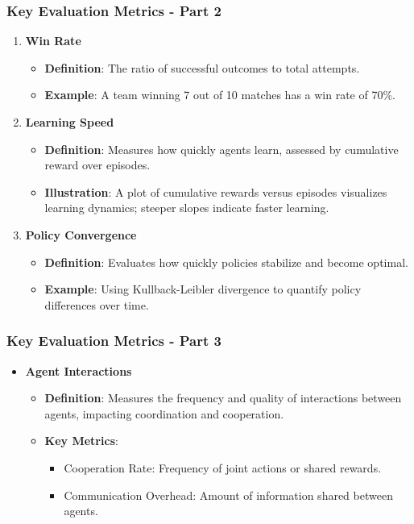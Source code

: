 \documentclass[aspectratio=169]{beamer}
\begin{document}
\begin{frame}[fragile]
    \frametitle{Key Evaluation Metrics - Part 2}
    \begin{enumerate}[resume]
        \item \textbf{Win Rate}
        \begin{itemize}
            \item \textbf{Definition}: The ratio of successful outcomes to total attempts.
            \item \textbf{Example}: A team winning 7 out of 10 matches has a win rate of 70\%.
        \end{itemize}
        
        \item \textbf{Learning Speed}
        \begin{itemize}
            \item \textbf{Definition}: Measures how quickly agents learn, assessed by cumulative reward over episodes.
            \item \textbf{Illustration}: A plot of cumulative rewards versus episodes visualizes learning dynamics; steeper slopes indicate faster learning.
        \end{itemize}
        
        \item \textbf{Policy Convergence}
        \begin{itemize}
            \item \textbf{Definition}: Evaluates how quickly policies stabilize and become optimal.
            \item \textbf{Example}: Using Kullback-Leibler divergence to quantify policy differences over time.
        \end{itemize}
    \end{enumerate}
\end{frame}

\begin{frame}[fragile]
    \frametitle{Key Evaluation Metrics - Part 3}
    \begin{itemize}
        \item \textbf{Agent Interactions}
        \begin{itemize}
            \item \textbf{Definition}: Measures the frequency and quality of interactions between agents, impacting coordination and cooperation.
            \item \textbf{Key Metrics}:
                \begin{itemize}
                    \item Cooperation Rate: Frequency of joint actions or shared rewards.
                    \item Communication Overhead: Amount of information shared between agents.
                \end{itemize}
        \end{itemize}
    \end{itemize}
\end{frame}
\end{document}
